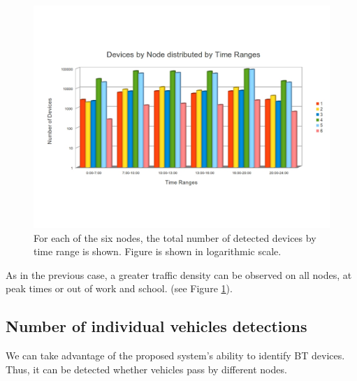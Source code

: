 \documentclass[preprint,authoryear,12pt]{elsarticle}
\begin{document}
 \begin{figure}[htb]
 \begin{center}
 \includegraphics[scale=0.4]{VehiculosPorHoras.jpg}
 \caption{For each of the six nodes, the total number of detected devices by time range is shown. Figure is shown in logarithmic scale.
 \label{VehiculosPorHoras}}
 \end{center}
 \end{figure}
 
As in the previous case, a greater traffic density can be observed on all nodes, at peak times or out of work and school. (see Figure \ref{VehiculosPorHoras}).


\subsection{Number of individual vehicles detections}

We can take advantage of the proposed system's ability to identify BT devices. Thus, it can be detected whether vehicles pass by different nodes.
\end{document}
